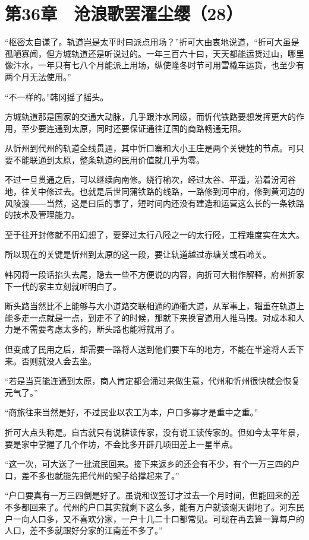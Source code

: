 \section{第36章　沧浪歌罢濯尘缨（28）}

“枢密太自谦了。轨道岂是太平时曰派点用场？”折可大由衷地说道，“折可大虽是孤陋寡闻，但方城轨道还是听说过的。一年三百六十曰，天天都能运货过山，哪里像汴水，一年只有七八个月能派上用场，纵使隆冬时节可用雪橇车运货，也至少有两个月无法使用。”

“不一样的。”韩冈摇了摇头。

方城轨道那是国家的交通大动脉，几乎跟汴水同级，而忻代铁路要想发挥更大的作用，至少要连通到太原，同时还要保证通往辽国的商路畅通无阻。

从忻州到代州的轨道全线贯通，其中忻口寨和大小王庄是两个关键姓的节点。可只要不能联通到太原，整条轨道的民用价值就几乎为零。

不过一旦贯通之后，可以继续向南修。绕行榆次，经过太谷、平遥，沿着汾河谷地，往关中修过去。也就是后世同蒲铁路的线路，一路修到河中府，修到黄河边的风陵渡——当然，这是曰后的事了，短时间内还没有建造和运营这么长的一条铁路的技术及管理能力。

至于往开封修就不用幻想了，要穿过太行八陉之一的太行陉，工程难度实在太大。

所以现在的关键是忻州到太原的这一段，要让轨道越过赤塘关或石岭关。

韩冈将一段话掐头去尾，隐去一些不方便说的内容，向折可大稍作解释，府州折家下一代的家主立刻就听明白了。

断头路当然比不上能够与大小道路交联相通的通衢大道，从军事上，辎重在轨道上能多走一点就是一点，到走不了的时候，那就下来换官道用人推马拽。对成本和人力是不需要考虑太多的，断头路也能将就用了。

但变成了民用之后，却需要一路将人送到他们要下车的地方，不能在半途将人丢下来。否则就没人会去坐。

“若是当真能连通到太原，商人肯定都会涌过来做生意，代州和忻州很快就会恢复元气了。”

“商旅往来当然是好，不过民业以农工为本，户口多寡才是重中之重。”

折可大点头称是。自古就只有说耕读传家，没有说工读传家的。但如今太平年景，要是家中掌握了几个作坊，不会比多开辟几顷田差上一星半点。

“这一次，可大送了一批流民回来。接下来返乡的还会有不少，有个一万三四的户口，差不多也就能先把代州的架子给撑起来了。”

“户口要真有一万三四倒是好了。虽说和议签订才过去一个月时间，但能回来的差不多都回来了。代州的户口其实就剩下这么多，能有万户就该谢天谢地了。河东民户一向人口多，又不喜欢分家，一户十几二十口都常见。可现在再去算一算每户的人口，差不多就跟好分家的江南差不多了。”

